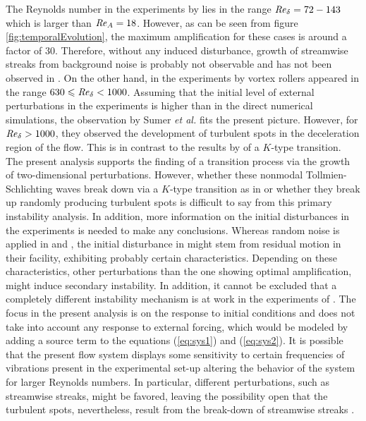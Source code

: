 \documentclass{jfm}
\let\le=\leqslant  \let\leq=\leqslant
\newcommand\Rey{\mbox{\textit{Re}}}  %
\begin{document}
The Reynolds number in the experiments by \citet{LiuParkCowen2007}
lies in the range $ \Rey_\delta = 72-143 $ which is
larger than $ \Rey_A = 18 $. However, as can be seen from figure
\ref{fig:temporalEvolution}, the maximum amplification for
these cases is around a factor of $ 30 $. Therefore,
without any induced disturbance, growth of streamwise streaks from
background noise is probably not observable and has not been observed
in \citet{LiuParkCowen2007}.
On the other hand, in the experiments by \citet{SumerJensenSorensenFredsoeLiuCarstensen2010} 
vortex rollers
appeared in the range $ 630  \le \Rey_\delta < 1000 $. Assuming that
the initial level of external perturbations in the experiments
is higher than in the direct numerical simulations, the
observation by Sumer {\em et al.} fits the present picture. 
However, for $ \Rey_\delta > 1000 $, they observed the
development of turbulent spots in the deceleration
region of the flow. This is in contrast to the
results by \citet{OzdemirHsuBalachandar2013} of a $ K$-type transition.
The present analysis
supports the finding of a transition process via the growth of
two-dimensional perturbations. However, whether these
nonmodal Tollmien-Schlichting waves break down via a $ K $-type
transition as in \citet{OzdemirHsuBalachandar2013} or whether
they break up randomly producing turbulent spots 
\citep{ShaikhGaster1994,Gaster2016} is difficult
to say from this primary instability analysis. In addition,
more information on the initial disturbances in the
experiments is needed to make any conclusions. 
Whereas random noise is applied in 
\citet{VittoriBlondeaux2008,VittoriBlondeaux2011}
and
\citet{OzdemirHsuBalachandar2013},
the initial disturbance in 
\citet{SumerJensenSorensenFredsoeLiuCarstensen2010} 
might stem from residual motion in their facility,
exhibiting probably certain
characteristics. Depending on these characteristics,
other perturbations than the one showing optimal amplification, might
induce secondary instability. In addition,
it cannot be
excluded that a completely different instability mechanism
is at work in the experiments of \citet{SumerJensenSorensenFredsoeLiuCarstensen2010}. The focus in the present analysis is on the response to
initial conditions and does not take into account
any response to external forcing, which would be modeled
by adding a source term to the equations (\ref{eq:sys1})
and (\ref{eq:sys2}). It is possible that the present flow
system displays some sensitivity to certain frequencies of
vibrations present in the experimental set-up altering
the behavior of the system for larger Reynolds numbers. In particular,
different perturbations, such as streamwise streaks, might be favored,
leaving the possibility open that the turbulent spots, nevertheless,
result from the break-down of streamwise streaks
\citep{AnderssonBrandtBottaroHenningson2001,BrandtSchlatterHenningson2004}.
\end{document}

